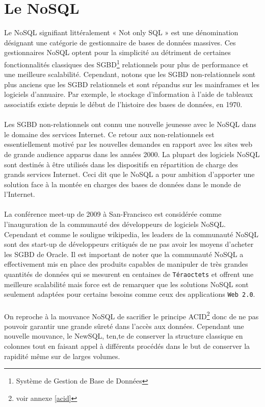 \section{Le \textsf{NoSQL}}

Le NoSQL signifiant littéralement « \textsf{Not only SQL} » est une
dénomination désignant une catégorie de gestionnaire de bases de
données massives. Ces gestionnaires \textsf{NoSQL} optent pour la
simplicité au détriment de certaines fonctionnalités classiques des
\textsf{SGBD}\footnote{Système de Gestion de Base de Données}
relationnels pour plus de performance et une meilleure
scalabilité. Cependant, notons que les \textsf{SGBD} non-relationnels
sont plus anciens que les \textsf{SGBD} relationnels et sont répandus
sur les mainframes et les logiciels d'annuaire. Par exemple, le
stockage d'information à l'aide de tableaux associatifs existe depuis
le début de l'histoire des bases de données, en 1970.  \\ \\ Les
\textsf{SGBD} non-relationnels ont connu une nouvelle jeunesse avec le
\textsf{NoSQL} dans le domaine des services \textsf{Internet}. Ce
retour aux non-relationnels est essentiellement motivé par les
nouvelles demandes en rapport avec les sites web de grande audience
apparus dans les années 2000. La plupart des logiciels \textsf{NoSQL}
sont destinés à être utilisés dans les dispositifs en répartition de
charge des grands services \textsf{Internet}. Ceci dit que le
\textsf{NoSQL} a pour ambition d'apporter une solution face à la
montée en charges des bases de données dans le monde de
l'\textsf{Internet}.  \\ \\ La conférence meet-up de 2009 à \textsf{San-Francisco} est considérée comme
l'inauguration de la communauté des développeurs de logiciels
\textsf{NoSQL}. Cependant et comme le souligne \textsf{wikipedia}, les
leaders de la communauté \textsf{NoSQL} sont des \textsf{start-up} de
développeurs critiqués de ne pas avoir les moyens d'acheter les
\textsf{SGBD} de Oracle\cite{wikiNoSQL}. Il est important de noter que
la communauté \textsf{NoSQL} a effectivement mis en place des produits
capables de manipuler de très grandes quantités de données qui se
mesurent en centaines de \texttt{Téraoctets} et offrent une meilleure
scalabilité mais force est de remarquer que les solutions
\textsf{NoSQL} sont seulement adaptées pour certains besoins comme
ceux des applications \texttt{Web 2.0}.  \\\\ On reproche à la
mouvance \textsf{NoSQL} de sacrifier le principe
\textsf{ACID}\footnote{voir annexe \ref{acid}} donc de ne pas pouvoir
garantir une grande sûreté dans l'accès aux données. Cependant une
nouvelle mouvance, le \textsf{NewSQL}, ten,te de conserver la
structure classique en colonnes tout en faisant appel à différents
procédés dans le but de conserver la rapidité même sur de larges
volumes\cite{newSQL}.

